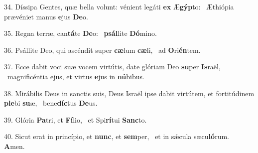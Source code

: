34. Díssipa Gentes, quæ bella volunt: vénient legáti \textbf{ex} Æ\textbf{gýp}to: \ast\  Æthiópia prævéniet manus \textbf{e}jus \textbf{De}o.\

35. Regna terræ, can\textbf{tá}te \textbf{De}o: \ast\  \textbf{psál}lite \textbf{Dó}mino.\

36. Psállite Deo, qui ascéndit super \textbf{cæ}lum \textbf{cæ}li, \ast\  ad \textbf{O}ri\textbf{én}tem.\

37. Ecce dabit voci suæ vocem virtútis, date glóriam Deo \textbf{su}per \textbf{Is}raël, \ast\  magnificéntia ejus, et virtus \textbf{e}jus in \textbf{nú}bibus.\

38. Mirábilis Deus in sanctis suis, Deus Israël ipse dabit virtútem, et fortitúdinem \textbf{ple}bi \textbf{su}æ, \ast\  bene\textbf{díc}tus \textbf{De}us.\

39. Glória \textbf{Pa}tri, et \textbf{Fí}lio, \ast\  et Spi\textbf{rí}tui \textbf{Sanc}to.\

40. Sicut erat in princípio, et \textbf{nunc}, et \textbf{sem}per, \ast\  et in sǽcula sæcu\textbf{ló}rum. \textbf{A}men.\


